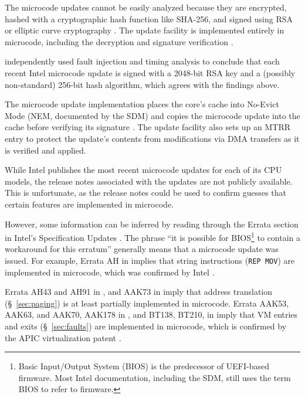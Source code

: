
The microcode updates cannot be easily analyzed because they are encrypted,
hashed with a cryptographic hash function like SHA-256, and signed using RSA or
elliptic curve cryptography \cite{intel2012patching}. The update facility is
implemented entirely in microcode, including the decryption and signature
verification \cite{intel2012patching}.

\cite{hawkes2012microcode} independently used fault injection and timing
analysis to conclude that each recent Intel microcode update is signed with a
2048-bit RSA key and a (possibly non-standard) 256-bit hash algorithm, which
agrees with the findings above.


The microcode update implementation places the core's cache into No-Evict Mode
(NEM, documented by the SDM) and copies the microcode update into the cache
before verifying its signature \cite{intel2012patching}. The update facility
also sets up an MTRR entry to protect the update's contents from modifications
via DMA transfers \cite{intel2012patching} as it is verified and applied.

While Intel publishes the most recent microcode updates for each of its CPU
models, the release notes associated with the updates are not publicly
available. This is unfortunate, as the release notes could be used to confirm
guesses that certain features are implemented in microcode.

However, some information can be inferred by reading through the Errata section
in Intel's Specification Updates
\cite{intel2010errata, intel2015errata, intel2015errata2}. The phrase ``it is
possible for BIOS\footnote{Basic Input/Output System (BIOS) is the predecessor
of UEFI-based firmware. Most Intel documentation, including the SDM, still uses
the term BIOS to refer to firmware.} to contain a workaround for this erratum''
generally means that a microcode update was issued. For example, Errata AH in
\cite{intel2010errata} implies that string instructions (\texttt{REP MOV}) are
implemented in microcode, which was confirmed by Intel
\cite{abraham2006repmov}.


Errata AH43 and AH91 in \cite{intel2010errata}, and AAK73 in
\cite{intel2015errata} imply that address translation (\S~\ref{sec:paging}) is
at least partially implemented in microcode. Errata AAK53, AAK63, and AAK70,
AAK178 in \cite{intel2015errata}, and BT138, BT210,  in \cite{intel2015errata2}
imply that VM entries and exits (\S~\ref{sec:faults}) are implemented in
microcode, which is confirmed by the APIC virtualization patent
\cite{intel2014vapic}.

